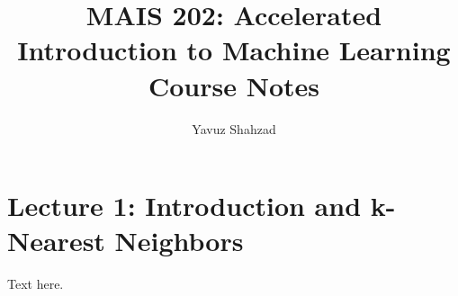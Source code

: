 \documentclass{tufte-handout}
\title{MAIS 202: Accelerated Introduction to Machine Learning Course Notes}
\author{Yavuz Shahzad}
\begin{document}
\maketitle
\section{Lecture 1: Introduction and k-Nearest Neighbors}
Text here.
\end{document}
